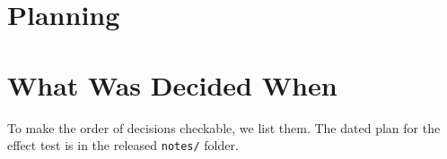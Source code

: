 \documentclass[letterpaper]{article}
\begin{document}
\section{Planning}
\label{sec:planning}

\begin{table}[h]
\centering
\resizebox{\columnwidth}{!}{}
\caption{Planning regret at $\lambda=1$, mean over seeds: how much further from target the chosen 27-way schedule of the first drug keeps the outcome, on average over the horizon, than the patient's best schedule. Open: one plan from the start. Closed: re-planned at each of the three segments after seeing the new readings. Fixed schedule: the one schedule best for all patients. Code: \texttt{scripts/planning.py}, \texttt{planning\_closed\_loop.py}.}
\label{tab:planning}
\end{table}

\section{What Was Decided When}
\label{sec:decisions}

To make the order of decisions checkable, we list them. The dated plan for the effect test is in the released \texttt{notes/} folder.
\end{document}
